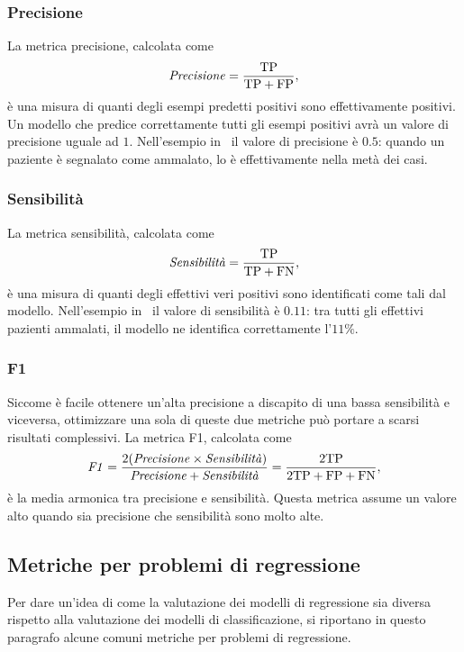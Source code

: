\subsubsection{Precisione} La metrica precisione, calcolata come
\begin{equation*}
    \textrm{\emph{Precisione}} = \frac{\text{TP}}{\text{TP} + \text{FP}},
\end{equation*}
è una misura di quanti degli esempi predetti positivi sono effettivamente positivi.
Un modello che predice correttamente tutti gli esempi positivi avrà un valore di precisione uguale ad $1$.
Nell'esempio in~ il valore di precisione è $0.5$: quando un paziente è segnalato come ammalato, lo è effettivamente nella metà dei casi.

\subsubsection{Sensibilità} La metrica sensibilità, calcolata come 
\begin{equation*}
    \textrm{\emph{Sensibilità}} = \frac{\text{TP}}{\text{TP} + \text{FN}},
\end{equation*}
è una misura di quanti degli effettivi veri positivi sono identificati come tali dal modello.
Nell'esempio in~ il valore di sensibilità è $0.11$: tra tutti gli effettivi pazienti ammalati, il modello ne identifica correttamente l'$11\%$.


\subsubsection{F1} 
Siccome è facile ottenere un'alta precisione a discapito di una bassa sensibilità e viceversa, ottimizzare una sola di queste due metriche può portare a scarsi risultati complessivi.
La metrica F1, calcolata come 
\begin{equation*}
    \textrm{\emph{F1}} = \frac{2(\text{\emph{Precisione}} \times \text{\emph{Sensibilità}})}{\text{\emph{Precisione}} + \text{\emph{Sensibilità}}} = \frac{2\text{TP}}{2\text{TP}+ \text{FP}+ \text{FN}},
\end{equation*}
è la media armonica tra precisione e sensibilità. Questa metrica assume un valore alto quando sia precisione che sensibilità sono molto alte.

\subsection{Metriche per problemi di regressione}
Per dare un'idea di come la valutazione dei modelli di regressione sia diversa rispetto alla valutazione dei modelli di classificazione, si riportano in questo paragrafo alcune comuni metriche per problemi di regressione. 

